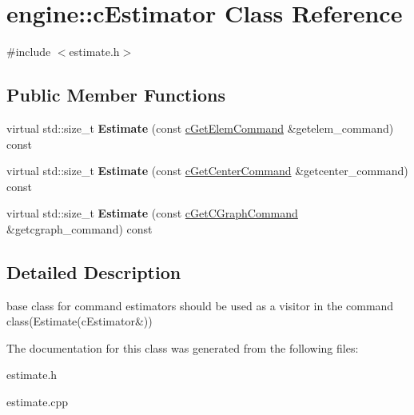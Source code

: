 \hypertarget{classengine_1_1cEstimator}{\section{engine\-:\-:c\-Estimator \-Class \-Reference}
\label{classengine_1_1cEstimator}
}


{\ttfamily \#include $<$estimate.\-h$>$}

\subsection*{\-Public \-Member \-Functions}
\begin{DoxyCompactItemize}
\item 
\hypertarget{classengine_1_1cEstimator_a6d2c3458e2ce412c10a355d651d9b98f}{virtual std\-::size\-\_\-t {\bfseries \-Estimate} (const \hyperlink{classengine_1_1cGetElemCommand}{c\-Get\-Elem\-Command} \&getelem\-\_\-command) const }\label{classengine_1_1cEstimator_a6d2c3458e2ce412c10a355d651d9b98f}

\item 
\hypertarget{classengine_1_1cEstimator_af6bcdcbb321c9d700571cf6fa1c06925}{virtual std\-::size\-\_\-t {\bfseries \-Estimate} (const \hyperlink{classengine_1_1cGetCenterCommand}{c\-Get\-Center\-Command} \&getcenter\-\_\-command) const }\label{classengine_1_1cEstimator_af6bcdcbb321c9d700571cf6fa1c06925}

\item 
\hypertarget{classengine_1_1cEstimator_add065c4c480b539c47b53195d6426764}{virtual std\-::size\-\_\-t {\bfseries \-Estimate} (const \hyperlink{classengine_1_1cGetCGraphCommand}{c\-Get\-C\-Graph\-Command} \&getcgraph\-\_\-command) const }\label{classengine_1_1cEstimator_add065c4c480b539c47b53195d6426764}

\end{DoxyCompactItemize}


\subsection{\-Detailed \-Description}
base class for command estimators should be used as a visitor in the command class(\-Estimate(c\-Estimator\&)) 

\-The documentation for this class was generated from the following files\-:\begin{DoxyCompactItemize}
\item 
estimate.\-h\item 
estimate.\-cpp\end{DoxyCompactItemize}
